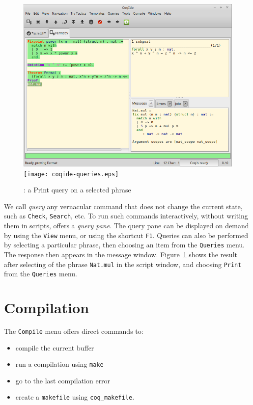 \begin{figure}[t]
\begin{center}
\ifpdf  %
\includegraphics[width=1.0\textwidth]{coqide-queries.png}
\else
\texttt{[image: coqide-queries.eps]}
\fi
\end{center}
\caption{\CoqIDE{}: a Print query on a selected phrase}
\label{fig:queryselected}
\end{figure}

We call \emph{query} any vernacular command that does not change the
current state, such as \verb|Check|, \verb|Search|, etc.
To run such commands interactively, without writing them in scripts,
\CoqIDE{} offers a \emph{query pane}.
The query pane can be displayed on demand by using the \texttt{View} menu,
or using the shortcut \verb|F1|. Queries can also be performed by
selecting a particular phrase, then choosing an item from the
\texttt{Queries} menu. The response then appears in the message window.
Figure~\ref{fig:queryselected} shows the result after selecting
of the phrase \verb|Nat.mul| in the script window, and choosing \verb|Print|
from the \texttt{Queries} menu.

\section{Compilation}

The \verb|Compile| menu offers direct commands to:
\begin{itemize}
\item compile the current buffer
\item run a compilation using \verb|make|
\item go to the last compilation error
\item create a \verb|makefile| using \verb|coq_makefile|.
\end{itemize}

